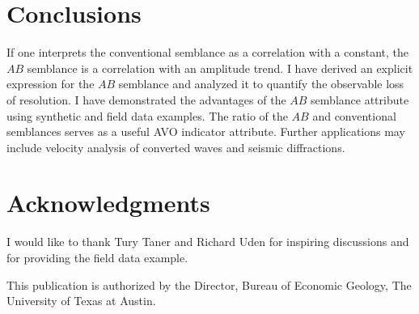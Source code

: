 

\section{Conclusions}

If one interprets the conventional semblance as a correlation with a
constant, the $AB$ semblance is a correlation with an amplitude
trend. I have derived an explicit expression for the $AB$ semblance
and analyzed it to quantify the observable loss of resolution. I have
demonstrated the advantages of the $AB$ semblance attribute using
synthetic and field data examples. The ratio of the $AB$ and
conventional semblances serves as a useful AVO indicator
attribute.   Further applications may  include velocity
analysis of converted waves and seismic diffractions.

\section{Acknowledgments}

I would like to thank Tury Taner and Richard Uden for inspiring
discussions and for providing the field data example.

This publication is authorized by the Director, Bureau of Economic
Geology, The University of Texas at Austin.


